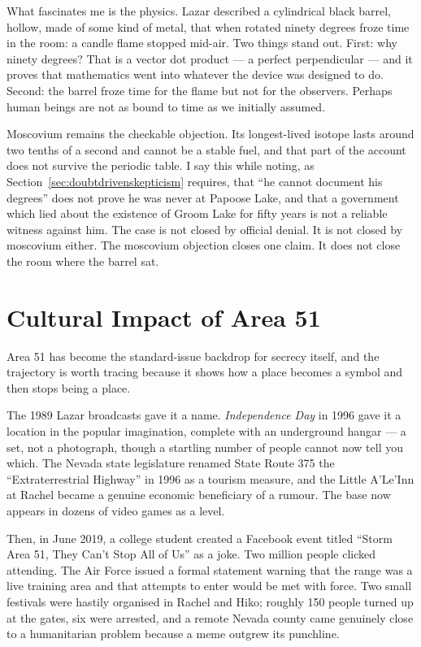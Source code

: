 What fascinates me is the physics. Lazar described a cylindrical black barrel, hollow,
made of some kind of metal, that when rotated ninety degrees froze time in the room: a
candle flame stopped mid-air. Two things stand out. First: why ninety degrees? That is a
vector dot product --- a perfect perpendicular --- and it proves that mathematics went into
whatever the device was designed to do. Second: the barrel froze time for the flame but
not for the observers. Perhaps human beings are not as bound to time as we initially
assumed.

Moscovium remains the checkable objection. Its longest-lived isotope lasts around two
tenths of a second and cannot be a stable fuel, and that part of the account does not
survive the periodic table. I say this while noting, as
Section~\ref{sec:doubtdrivenskepticism} requires, that ``he cannot document his degrees'' does
not prove he was never at Papoose Lake, and that a government which lied about the
existence of Groom Lake for fifty years is not a reliable witness against him. The case is
not closed by official denial. It is not closed by moscovium either. The moscovium
objection closes one claim. It does not close the room where the barrel sat.
\section{Cultural Impact of Area 51}\label{sec:culturalimpactarea51}

Area 51 has become the standard-issue backdrop for secrecy itself, and the trajectory is
worth tracing because it shows how a place becomes a symbol and then stops being a place.

The 1989 Lazar broadcasts gave it a name. \emph{Independence Day} in 1996 gave it a
location in the popular imagination, complete with an underground hangar --- a set, not a
photograph, though a startling number of people cannot now tell you which. The Nevada
state legislature renamed State Route 375 the ``Extraterrestrial Highway'' in 1996 as a
tourism measure, and the Little A'Le'Inn at Rachel became a genuine economic
beneficiary of a rumour. The base now appears in dozens of video games as a level.

Then, in June 2019, a college student created a Facebook event titled ``Storm Area 51,
They Can't Stop All of Us'' as a joke. Two million people clicked attending. The Air Force
issued a formal statement warning that the range was a live training area and that
attempts to enter would be met with force. Two small festivals were hastily organised in
Rachel and Hiko; roughly 150 people turned up at the gates, six were arrested, and a
remote Nevada county came genuinely close to a humanitarian problem because a meme
outgrew its punchline.

